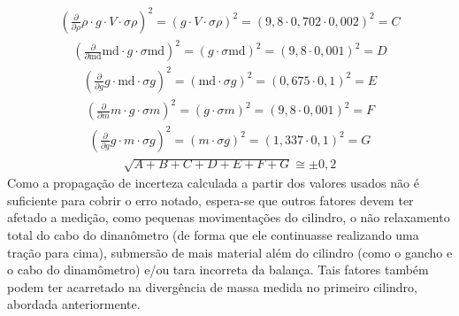 \begin{align*}
\left( \frac{\partial }{\partial \rho} \rho \cdot g \cdot V \cdot \sigma \rho \right)^{2} = \left( g \cdot V \cdot \sigma \rho \right)^{2} = \left( 9,8 \cdot 0,702 \cdot 0,002 \right)^{2} =C
\end{align*}
\begin{align*}
\left( \frac{\partial }{\partial \mbox{md}} \mbox{md} \cdot g \cdot \sigma \mbox{md} \right)^{2} = \left( g \cdot \sigma \mbox{md} \right)^{2} = \left( 9,8 \cdot 0,001 \right)^{2} =D
\end{align*}
\begin{align*}
\left( \frac{\partial }{\partial g} g\cdot \mbox{md} \cdot \sigma g \right)^{2} = \left( \mbox{md} \cdot \sigma g \right)^{2} = \left( 0,675 \cdot 0,1 \right)^{2} =E
\end{align*}
\begin{align*}
\left( \frac{\partial }{\partial m} m \cdot g \cdot \sigma m \right)^{2} = \left( g \cdot \sigma m \right)^{2} = \left( 9,8 \cdot 0,001 \right)^{2} =F
\end{align*}
\begin{align*}
\left( \frac{\partial }{\partial g} g \cdot m \cdot \sigma g \right)^{2} = \left( m \cdot \sigma g \right)^{2} = \left( 1,337 \cdot 0,1 \right)^{2} =G
\end{align*}
\begin{align*}
\sqrt{A+B+C+D+E+F+G} \cong \pm 0,2
\end{align*}
Como a propagação de incerteza calculada a partir dos valores usados não é suficiente para cobrir o erro notado, espera-se que outros fatores devem ter afetado a medição, como pequenas movimentações do cilindro, o não relaxamento total do cabo do dinanômetro (de forma que ele continuasse realizando uma tração para cima), submersão de mais material além do cilindro (como o gancho e o cabo do dinamômetro) e/ou tara incorreta da balança. Tais fatores também podem ter acarretado na divergência de massa medida no primeiro cilindro, abordada anteriormente.

